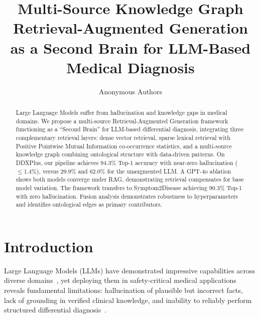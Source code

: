 \documentclass[runningheads]{llncs}
\begin{document}
\title{Multi-Source Knowledge Graph Retrieval-Augmented Generation as a Second Brain for LLM-Based Medical Diagnosis}


\author{Anonymous Authors}

\maketitle

\begin{abstract}
Large Language Models suffer from hallucination and knowledge gaps in medical domains. We propose a multi-source Retrieval-Augmented Generation framework functioning as a ``Second Brain'' for LLM-based differential diagnosis, integrating three complementary retrieval layers: dense vector retrieval, sparse lexical retrieval with Positive Pointwise Mutual Information co-occurrence statistics, and a multi-source knowledge graph combining ontological structure with data-driven patterns. On DDXPlus, our pipeline achieves 94.3\% Top-1 accuracy with near-zero hallucination ($\leq$1.4\%), versus 29.9\% and 62.0\% for the unaugmented LLM. A GPT-4o ablation shows both models converge under RAG, demonstrating retrieval compensates for base model variation. The framework transfers to Symptom2Disease achieving 90.3\% Top-1 with zero hallucination. Fusion analysis demonstrates robustness to hyperparameters and identifies ontological edges as primary contributors.

\end{abstract}

\section{Introduction}
\label{sec:introduction}

Large Language Models (LLMs) have demonstrated impressive capabilities across diverse domains~\cite{brown2020language,openai2023gpt4}, yet deploying them in safety-critical medical applications reveals fundamental limitations: hallucination of plausible but incorrect facts, lack of grounding in verified clinical knowledge, and inability to reliably perform structured differential diagnosis~\cite{ji2023survey,singhal2023large}.
\end{document}
